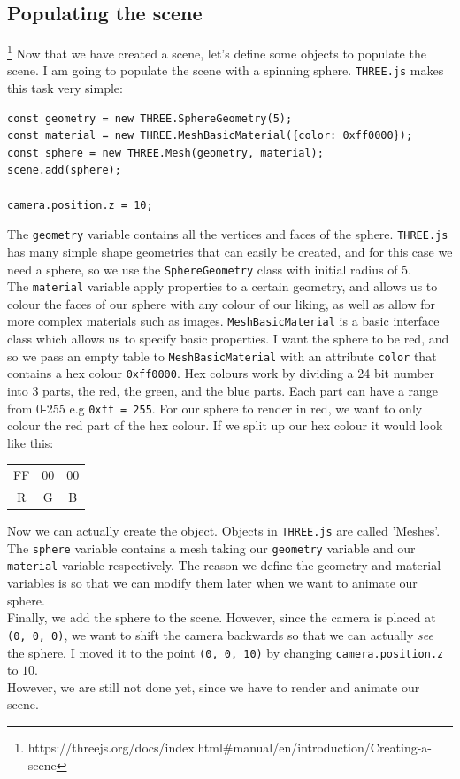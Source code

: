 \subsection{Populating the scene}\footnote{https://threejs.org/docs/index.html\#manual/en/introduction/Creating-a-scene}
Now that we have created a scene, let's define some objects to populate the scene. I am going to populate the scene with a spinning sphere. \verb|THREE.js| makes this task very simple:
\begin{lstlisting}
const geometry = new THREE.SphereGeometry(5);
const material = new THREE.MeshBasicMaterial({color: 0xff0000});
const sphere = new THREE.Mesh(geometry, material);
scene.add(sphere);

camera.position.z = 10;
\end{lstlisting}
The \verb|geometry| variable contains all the vertices and faces of the sphere. \verb|THREE.js| has many simple shape geometries that can easily be created, and for this case we need a sphere, so we use the \verb|SphereGeometry| class with initial radius of $5$. \\
The \verb|material| variable apply properties to a certain geometry, and allows us to colour the faces of our sphere with any colour of our liking, as well as allow for more complex materials such as images. \verb|MeshBasicMaterial| is a basic interface class which allows us to specify basic properties. I want the sphere to be red, and so we pass an empty table to \verb|MeshBasicMaterial| with an attribute \verb|color| that contains a hex colour \verb|0xff0000|. Hex colours work by dividing a 24 bit number into 3 parts, the red, the green, and the blue parts. Each part can have a range from 0-255 e.g \verb|0xff = 255|. For our sphere to render in red, we want to only colour the red part of the hex colour. If we split up our hex colour it would look like this:
\begin{center}
\begin{tabular}{|c| |c| |c|}
FF & 00 & 00 \\
R  & G  & B
\end{tabular}
\end{center}
Now we can actually create the object. Objects in \verb|THREE.js| are called 'Meshes'. The \verb|sphere| variable contains a mesh taking our \verb|geometry| variable and our \verb|material| variable respectively. The reason we define the geometry and material variables is so that we can modify them later when we want to animate our sphere. \\
Finally, we add the sphere to the scene. However, since the camera is placed at \verb|(0, 0, 0)|, we want to shift the camera backwards so that we can actually \textit{see} the sphere. I moved it to the point \verb|(0, 0, 10)| by changing \verb|camera.position.z| to $10$. \\
However, we are still not done yet, since we have to render and animate our scene.

